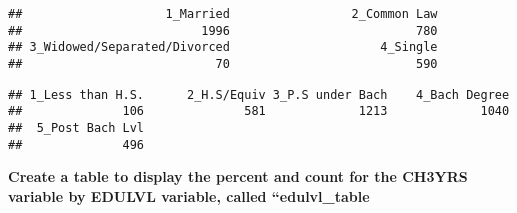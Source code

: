 \documentclass[
]{article}
\newenvironment{Shaded}{\begin{snugshade}}{\end{snugshade}}
\newcommand{\FunctionTok}[1]{\textcolor[rgb]{0.13,0.29,0.53}{\textbf{#1}}}
\newcommand{\NormalTok}[1]{#1}
\newcommand{\SpecialCharTok}[1]{\textcolor[rgb]{0.81,0.36,0.00}{\textbf{#1}}}
\begin{document}
\begin{verbatim}
##                    1_Married                 2_Common Law 
##                         1996                          780 
## 3_Widowed/Separated/Divorced                     4_Single 
##                           70                          590
\end{verbatim}

\begin{Shaded}
\end{Shaded}

\begin{verbatim}
## 1_Less than H.S.      2_H.S/Equiv 3_P.S under Bach    4_Bach Degree 
##              106              581             1213             1040 
##  5_Post Bach Lvl 
##              496
\end{verbatim}

\textbf{Create a table to display the percent and count for the CH3YRS
variable by EDULVL variable, called ``edulvl\_table}
\end{document}
